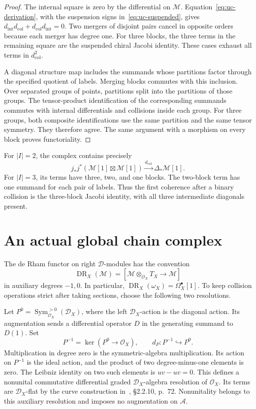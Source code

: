 \begin{proof}
The internal square is zero by the differential on $\mathcal M$.
Equation~\eqref{eq:uc-derivation}, with the suspension signs in~\eqref{eq:uc-suspended}, gives
$d_{\mathrm{int}}d_{\mathrm{col}}+d_{\mathrm{col}}d_{\mathrm{int}}=0$.
Two mergers of disjoint pairs cancel in opposite orders because each merger has degree one.
For three blocks, the three terms in the remaining square are the suspended chiral Jacobi identity.
These cases exhaust all terms in $d_{\mathrm{col}}^2$.

A diagonal structure map includes the summands whose partitions factor through the specified quotient of labels.
Merging blocks commutes with this inclusion.
Over separated groups of points, partitions split into the partitions of those groups.
The tensor-product identification of the corresponding summands commutes with internal differentials and collisions inside each group.
For three groups, both composite identifications use the same partition and the same tensor symmetry.
They therefore agree.
The same argument with a morphism on every block proves functoriality.
\end{proof}

For $|I|=2$, the complex contains precisely
\[
 j_*j^*(\mathcal M[1]\boxtimes\mathcal M[1])
 \xrightarrow{d_{\mathrm{col}}}\Delta_*\mathcal M[1].
\]
For $|I|=3$, its terms have three, two, and one blocks.
The two-block term has one summand for each pair of labels.
Thus the first coherence after a binary collision is the three-block Jacobi identity, with all three intermediate diagonals present.

\section{An actual global chain complex}

The de Rham functor on right $\mathcal D$-modules has the convention
\[
 \operatorname{DR}_X(\mathcal M)
 =[\mathcal M\otimes_{\mathcal O_X}T_X\longrightarrow\mathcal M]
\]
in auxiliary degrees $-1,0$.
In particular, $\operatorname{DR}_X(\omega_X)=\Omega_X^\bullet[1]$.
To keep collision operations strict after taking sections, choose the following two resolutions.

Let $P^0=\operatorname{Sym}_{\mathcal O_X}^{>0}(\mathcal D_X)$, where the left $\mathcal D_X$-action is the diagonal action.
Its augmentation sends a differential operator $D$ in the generating summand to $D(1)$.
Set
\[
 P^{-1}=\ker(P^0\to\mathcal O_X),\qquad d_P:P^{-1}\hookrightarrow P^0.
\]
Multiplication in degree zero is the symmetric-algebra multiplication.
Its action on $P^{-1}$ is the ideal action, and the product of two degree-minus-one elements is zero.
The Leibniz identity on two such elements is $uv-uv=0$.
This defines a nonunital commutative differential graded $\mathcal D_X$-algebra resolution of $\mathcal O_X$.
Its terms are $\mathcal D_X$-flat by the curve construction in~\cite{BD026}, \S2.2.10, p.~72.
Nonunitality belongs to this auxiliary resolution and imposes no augmentation on $\mathcal A$.

